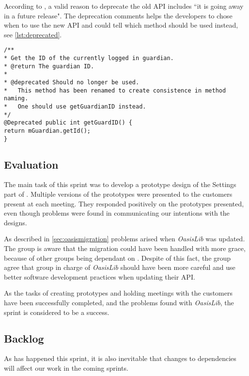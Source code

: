 According to \citet{deprecatedreference}, a valid reason to deprecate the old API includes ``it is going away in a future release". The deprecation comments helps the developers to chose when to use the new API and could tell which method should be used instead, see \cref{lst:deprecated}.

\begin{lstlisting}[caption={Example of a deprecated method could look like this.}, label={lst:deprecated}]
/**
* Get the ID of the currently logged in guardian.
* @return The guardian ID.
* 
* @deprecated Should no longer be used.
* 	This method has been renamed to create consistence in method naming.
*	One should use getGuardianID instead.
*/
@Deprecated public int getGuardID() {
return mGuardian.getId();
}
\end{lstlisting}

\subsection{Evaluation}
The main task of this sprint was to develop a prototype design of the Settings part of \launcher.
Multiple versions of the prototypes were presented to the customers present at each meeting.
They responded positively on the prototypes presented, even though problems were found in communicating our intentions with the designs.

As described in \cref{sec:oasismigration} problems arised when \textit{OasisLib} was updated.
The group is aware that the migration could have been handled with more grace, because of other groups being dependant on \launcher.
Despite of this fact, the group agree that group in charge of \textit{OasisLib} should have been more careful and use better software development practices when updating their API.

As the tasks of creating prototypes and holding meetings with the customers have been successfully completed, and the problems found with \textit{OasisLib}, the sprint is considered to be a success.

\subsection{Backlog}\label{sec:sprint2:conclusionmeetings}


As has happened this sprint, it is also inevitable that changes to dependencies will affect our work in the coming sprints.